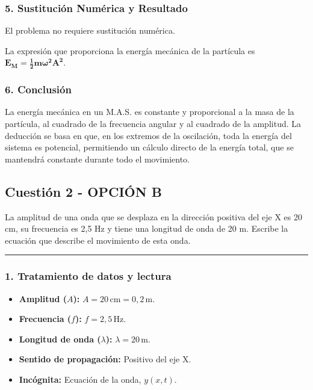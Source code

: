 \subsubsection*{5. Sustitución Numérica y Resultado}
El problema no requiere sustitución numérica.
\begin{cajaresultado}
La expresión que proporciona la energía mecánica de la partícula es $\boldsymbol{E_M = \frac{1}{2}m\omega^2A^2}$.
\end{cajaresultado}

\subsubsection*{6. Conclusión}
\begin{cajaconclusion}
La energía mecánica en un M.A.S. es constante y proporcional a la masa de la partícula, al cuadrado de la frecuencia angular y al cuadrado de la amplitud. La deducción se basa en que, en los extremos de la oscilación, toda la energía del sistema es potencial, permitiendo un cálculo directo de la energía total, que se mantendrá constante durante todo el movimiento.
\end{cajaconclusion}

\newpage

\subsection{Cuestión 2 - OPCIÓN B}
\label{subsec:2B_2006_jun_ord}

\begin{cajaenunciado}
La amplitud de una onda que se desplaza en la dirección positiva del eje X es 20 cm, su frecuencia es 2,5 Hz y tiene una longitud de onda de 20 m. Escribe la ecuación que describe el movimiento de esta onda.
\end{cajaenunciado}
\hrule

\subsubsection*{1. Tratamiento de datos y lectura}
\begin{itemize}
    \item \textbf{Amplitud ($A$):} $A = 20\,\text{cm} = 0,2\,\text{m}$.
    \item \textbf{Frecuencia ($f$):} $f = 2,5\,\text{Hz}$.
    \item \textbf{Longitud de onda ($\lambda$):} $\lambda = 20\,\text{m}$.
    \item \textbf{Sentido de propagación:} Positivo del eje X.
    \item \textbf{Incógnita:} Ecuación de la onda, $y(x,t)$.
\end{itemize}

